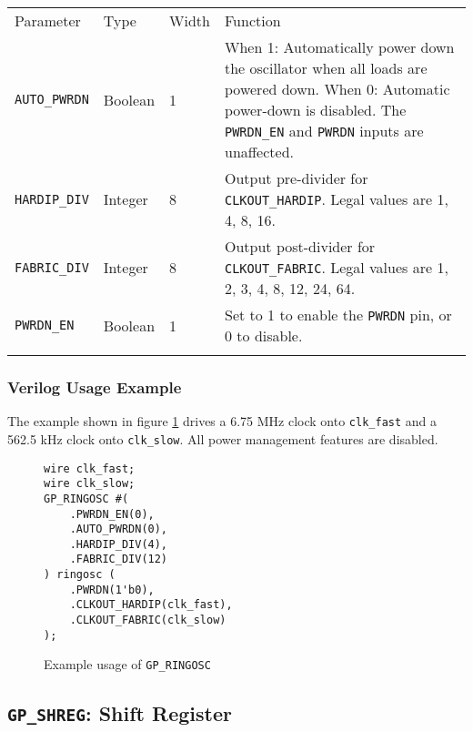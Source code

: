 \documentclass[11pt]{article}
\newcommand{\tokenstyle}[1]{\texttt{#1}}
\newcommand{\wirestyle}[1]{\texttt{#1}}
\newcommand{\whenstyle}[1]{{\fontseries{sb}\selectfont#1}}
\newcommand{\thinhline}{\Xhline{1\arrayrulewidth}}
\newcommand{\thickhline}{\Xhline{2.5\arrayrulewidth}}
\begin{document}
\begin{tabularx}{\textwidth}{lllX}
\thinhline
\whenstyle{Parameter} & \whenstyle{Type} & \whenstyle{Width} & \whenstyle{Function} \\
\thickhline
\tokenstyle{AUTO\_PWRDN} & Boolean & 1 &
	\whenstyle{When 1:} Automatically power down the oscillator when all loads are powered down. \newline
	\whenstyle{When 0:} Automatic power-down is disabled. The \tokenstyle{PWRDN\_EN} and \tokenstyle{PWRDN} inputs are unaffected.\\
\thinhline
\tokenstyle{HARDIP\_DIV} & Integer & 8 &
	Output pre-divider for \tokenstyle{CLKOUT\_HARDIP}. Legal values are 1, 4, 8, 16. \\
\thinhline
\tokenstyle{FABRIC\_DIV} & Integer & 8 &
	Output post-divider for \tokenstyle{CLKOUT\_FABRIC}. Legal values are 1, 2, 3, 4, 8, 12, 24, 64. \\
\thinhline
\tokenstyle{PWRDN\_EN} & Boolean & 1 & Set to 1 to enable the \tokenstyle{PWRDN} pin, or 0 to disable. \\
\thinhline
\end{tabularx}

\pagebreak
\subsubsection{Verilog Usage Example}

The example shown in figure \ref{gp-ringosc-example} drives a 6.75 MHz clock onto \wirestyle{clk\_fast} and a 562.5 kHz clock onto
\wirestyle{clk\_slow}. All power management features are disabled.

\begin{figure}[h]
\begin{lstlisting}
wire clk_fast;
wire clk_slow;
GP_RINGOSC #(
	.PWRDN_EN(0),
	.AUTO_PWRDN(0),
	.HARDIP_DIV(4),
	.FABRIC_DIV(12)
) ringosc (
	.PWRDN(1'b0),
	.CLKOUT_HARDIP(clk_fast),
	.CLKOUT_FABRIC(clk_slow)
);
\end{lstlisting}
\caption{Example usage of \tokenstyle{GP\_RINGOSC}}
\label{gp-ringosc-example}
\end{figure}


\pagebreak
\clearpage
\subsection{\tokenstyle{GP\_SHREG}: Shift Register}
\label{gp-shreg}
\end{document}
